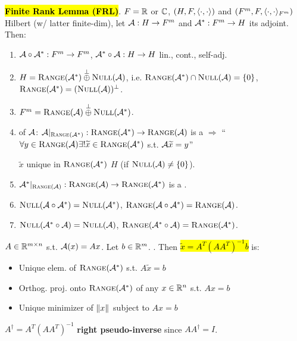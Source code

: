 \begin{Theorem}
\textbf{\hl{Finite Rank Lemma (FRL)}}\hypertarget{FRL}{.} $F=\mathbb R$ or $\mathbb C$, $(H,F,\langle\cdot,\cdot\rangle)$ and $(F^m,F,\langle\cdot,\cdot\rangle_{F^m})$ Hilbert (w/ latter finite-dim), let $\mathcal{A}:H\to F^m$ and $\mathcal{A}^*:F^m\to H$ its adjoint. Then:
\begin{enumerate}[leftmargin=4mm]
  \item $\mathcal{A}\circ\mathcal{A}^*:F^m\to F^m$, $\mathcal{A}^*\circ\mathcal{A}:H\to H$ lin., cont., self-adj.
  \item $H=\textsc{Range}(\mathcal{A}^*)\overset{\perp}{\oplus}\textsc{Null}(\mathcal{A})$, i.e. $\textsc{Range}(\mathcal{A}^*)\cap\textsc{Null}(\mathcal{A})=\{0\}$, $\textsc{Range}(\mathcal{A}^*)=(\textsc{Null}(\mathcal{A}))^\perp$.
  \item $F^m=\textsc{Range}(\mathcal{A})\overset{\perp}{\oplus}\textsc{Null}(\mathcal{A}^*)$.
  \item \textit{} of $\mathcal{A}$: $\mathcal{A}|_{\textsc{Range}(\mathcal{A}^*)}:\textsc{Range}(\mathcal{A}^*)\to \textsc{Range}(\mathcal{A})$ is a \textit{} $\Rightarrow$ ``$\forall y\in\textsc{Range}(\mathcal{A})\exists!\widetilde x\in\textsc{Range}(\mathcal{A}^*)$ s.t. $\mathcal{A}\widetilde x=y$''
  
  \begin{Fact}
  $\widetilde x$ unique in $\textsc{Range}(\mathcal{A}^*)$  $H$ (if $\textsc{Null}(\mathcal{A})\ne\{0\}$).
  \end{Fact}
  \item $\mathcal{A}^*|_{\textsc{Range}(\mathcal{A})}:\textsc{Range}(\mathcal{A})\to \textsc{Range}(\mathcal{A}^*)$ is a \textit{}.
  \item $\textsc{Null}(\mathcal{A}\circ\mathcal{A}^*)=\textsc{Null}(\mathcal{A}^*)$, $\textsc{Range}(\mathcal{A}\circ\mathcal{A}^*)=\textsc{Range}(\mathcal{A})$.
  \item $\textsc{Null}(\mathcal{A}^*\circ\mathcal{A})=\textsc{Null}(\mathcal{A})$, $\textsc{Range}(\mathcal{A}^*\circ\mathcal{A})=\textsc{Range}(\mathcal{A}^*)$.
\end{enumerate}
\end{Theorem}
\begin{Theorem}
$A\in\mathbb R^{m\times n}$ s.t. $\mathcal{A}(x)=Ax$. Let $b\in\mathbb R^m$. . Then \hl{$\widetilde x=A^T(AA^T)^{-1}b$} is:
\begin{itemize}[leftmargin=4mm]
  \item Unique elem. of $\textsc{Range}(\mathcal{A}^*)$ s.t. $A\widetilde x=b$
  \item Orthog. proj. onto $\textsc{Range}(\mathcal{A}^*)$ of any $x\in\mathbb R^n$ s.t. $Ax=b$
  \item Unique minimizer of $\|x\|_{}$ subject to $Ax=b$
\end{itemize}
\begin{Definition}
$A^\dagger=A^T(AA^T)^{-1}$ \textbf{right pseudo-inverse} since $AA^\dagger=I$.
\end{Definition}
\end{Theorem}

